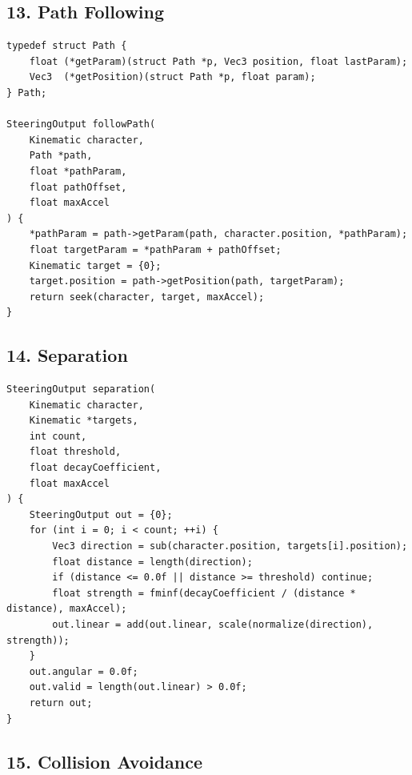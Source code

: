 \documentclass[10pt,letterpaper]{article}
\begin{document}
\subsection*{13. Path Following}
{}

\begin{verbatim}
typedef struct Path {
    float (*getParam)(struct Path *p, Vec3 position, float lastParam);
    Vec3  (*getPosition)(struct Path *p, float param);
} Path;

SteeringOutput followPath(
    Kinematic character,
    Path *path,
    float *pathParam,
    float pathOffset,
    float maxAccel
) {
    *pathParam = path->getParam(path, character.position, *pathParam);
    float targetParam = *pathParam + pathOffset;
    Kinematic target = {0};
    target.position = path->getPosition(path, targetParam);
    return seek(character, target, maxAccel);
}
\end{verbatim}

\subsection*{14. Separation}
{}

\begin{verbatim}
SteeringOutput separation(
    Kinematic character,
    Kinematic *targets,
    int count,
    float threshold,
    float decayCoefficient,
    float maxAccel
) {
    SteeringOutput out = {0};
    for (int i = 0; i < count; ++i) {
        Vec3 direction = sub(character.position, targets[i].position);
        float distance = length(direction);
        if (distance <= 0.0f || distance >= threshold) continue;
        float strength = fminf(decayCoefficient / (distance * distance), maxAccel);
        out.linear = add(out.linear, scale(normalize(direction), strength));
    }
    out.angular = 0.0f;
    out.valid = length(out.linear) > 0.0f;
    return out;
}
\end{verbatim}

\subsection*{15. Collision Avoidance}
{}
\end{document}
